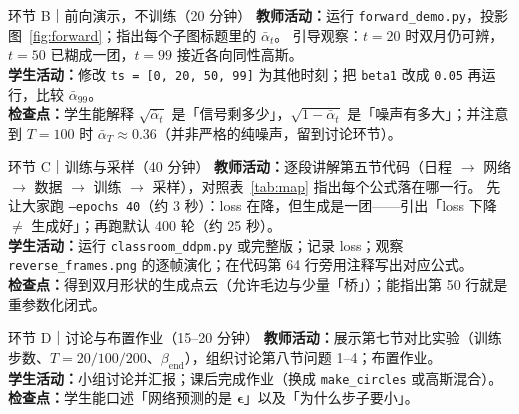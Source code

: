 \documentclass[a4paper,fontset=none,zihao=5]{ctexart}
\newcommand{\abar}{\bar{\alpha}}
\newcommand{\eps}{\boldsymbol{\epsilon}}
\newcommand{\code}[1]{\texttt{#1}}
\begin{document}
\begin{stepbox}{环节 B｜前向演示，不训练（20 分钟）}
\textbf{教师活动：}运行 \code{forward\_demo.py}，投影图~\ref{fig:forward}；指出每个子图标题里的 $\abar_t$。
引导观察：$t=20$ 时双月仍可辨，$t=50$ 已糊成一团，$t=99$ 接近各向同性高斯。\\
\textbf{学生活动：}修改 \code{ts = [0, 20, 50, 99]} 为其他时刻；把 \code{beta1} 改成 \code{0.05} 再运行，比较 $\abar_{99}$。\\
\textbf{检查点：}学生能解释 $\sqrt{\abar_t}$ 是「信号剩多少」，$\sqrt{1-\abar_t}$ 是「噪声有多大」；并注意到 $T=100$ 时 $\abar_{T}\approx0.36$（并非严格的纯噪声，留到讨论环节）。
\end{stepbox}

\begin{stepbox}{环节 C｜训练与采样（40 分钟）}
\textbf{教师活动：}逐段讲解第五节代码（日程 $\to$ 网络 $\to$ 数据 $\to$ 训练 $\to$ 采样），对照表~\ref{tab:map} 指出每个公式落在哪一行。
先让大家跑 \code{--epochs 40}（约 3 秒）：loss 在降，但生成是一团——引出「loss 下降 $\neq$ 生成好」；再跑默认 400 轮（约 25 秒）。\\
\textbf{学生活动：}运行 \code{classroom\_ddpm.py} 或完整版；记录 loss；观察 \code{reverse\_frames.png} 的逐帧演化；在代码第 64 行旁用注释写出对应公式。\\
\textbf{检查点：}得到双月形状的生成点云（允许毛边与少量「桥」）；能指出第 50 行就是重参数化闭式。
\end{stepbox}

\begin{stepbox}{环节 D｜讨论与布置作业（15–20 分钟）}
\textbf{教师活动：}展示第七节对比实验（训练步数、$T=20/100/200$、$\beta_{\text{end}}$），组织讨论第八节问题 1–4；布置作业。\\
\textbf{学生活动：}小组讨论并汇报；课后完成作业（换成 \code{make\_circles} 或高斯混合）。\\
\textbf{检查点：}学生能口述「网络预测的是 $\eps$」以及「为什么步子要小」。
\end{stepbox}
\end{document}

